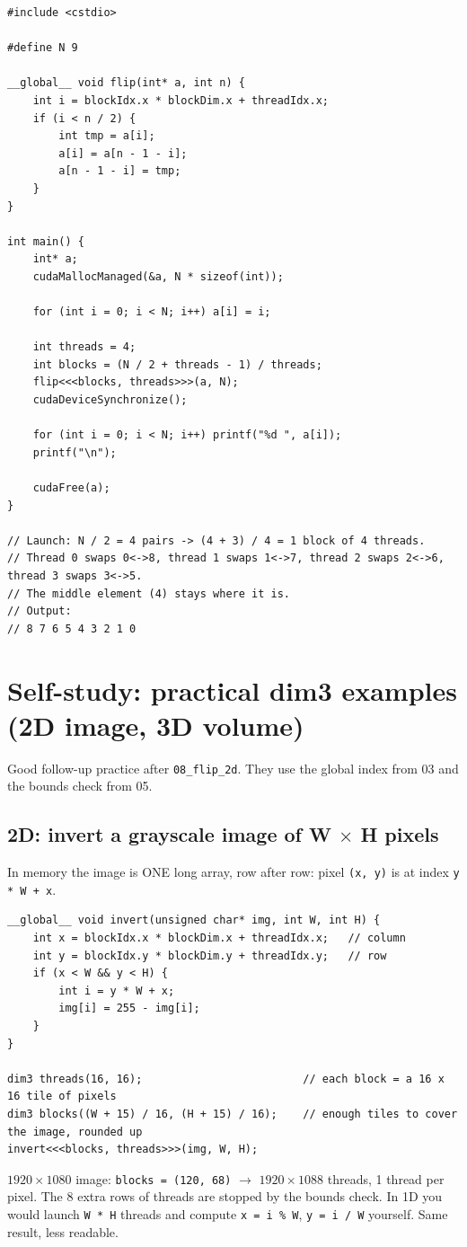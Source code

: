 \documentclass[main.tex]{subfiles}
\begin{document}
\begin{lstlisting}[language=CUDA]
#include <cstdio>

#define N 9

__global__ void flip(int* a, int n) {
    int i = blockIdx.x * blockDim.x + threadIdx.x;
    if (i < n / 2) {
        int tmp = a[i];
        a[i] = a[n - 1 - i];
        a[n - 1 - i] = tmp;
    }
}

int main() {
    int* a;
    cudaMallocManaged(&a, N * sizeof(int));

    for (int i = 0; i < N; i++) a[i] = i;

    int threads = 4;
    int blocks = (N / 2 + threads - 1) / threads;
    flip<<<blocks, threads>>>(a, N);
    cudaDeviceSynchronize();

    for (int i = 0; i < N; i++) printf("%d ", a[i]);
    printf("\n");

    cudaFree(a);
}

// Launch: N / 2 = 4 pairs -> (4 + 3) / 4 = 1 block of 4 threads.
// Thread 0 swaps 0<->8, thread 1 swaps 1<->7, thread 2 swaps 2<->6, thread 3 swaps 3<->5.
// The middle element (4) stays where it is.
// Output:
// 8 7 6 5 4 3 2 1 0
\end{lstlisting}

\section{Self-study: practical dim3 examples (2D image, 3D volume)}

Good follow-up practice after \texttt{08\_flip\_2d}. They use the global index from 03 and the bounds check from 05.

\subsection{2D: invert a grayscale image of W $\times$ H pixels}
In memory the image is ONE long array, row after row: pixel \texttt{(x, y)} is at index \texttt{y * W + x}.
\begin{lstlisting}[language=CUDA]
__global__ void invert(unsigned char* img, int W, int H) {
    int x = blockIdx.x * blockDim.x + threadIdx.x;   // column
    int y = blockIdx.y * blockDim.y + threadIdx.y;   // row
    if (x < W && y < H) {
        int i = y * W + x;
        img[i] = 255 - img[i];
    }
}

dim3 threads(16, 16);                         // each block = a 16 x 16 tile of pixels
dim3 blocks((W + 15) / 16, (H + 15) / 16);    // enough tiles to cover the image, rounded up
invert<<<blocks, threads>>>(img, W, H);
\end{lstlisting}
$1920 \times 1080$ image: \texttt{blocks = (120, 68)} $\rightarrow$ $1920 \times 1088$ threads, 1 thread per pixel.
The 8 extra rows of threads are stopped by the bounds check.
In 1D you would launch \texttt{W * H} threads and compute \texttt{x = i \% W}, \texttt{y = i / W} yourself. Same result, less readable.
\end{document}
